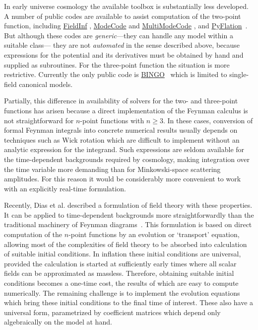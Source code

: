 \documentclass[11pt,a4paper]{article}
\newcommand{\packagefont}{\sffamily}
\newcommand{\ModeCode}{{\packagefont ModeCode}}
\newcommand{\MultiModeCode}{{\packagefont MultiModeCode}}
\newcommand{\FieldInf}{{\packagefont FieldInf}}
\newcommand{\PyFlation}{{\packagefont PyFlation}}
\newcommand{\BINGO}{{\packagefont BINGO}}
\renewcommand{\geq}{\geqslant}
\begin{document}
In early universe cosmology the available toolbox is substantially less developed.
A number of public codes are available to assist computation of the
two-point function,
including
\href{http://theory.physics.unige.ch/~ringeval/fieldinf.html}{\FieldInf}
\cite{Ringeval:2005yn,Martin:2006rs,Ringeval:2007am},
\href{http://modecode.org}{\ModeCode} and
\href{http://modecode.org}{\MultiModeCode}
\cite{Mortonson:2010er,Easther:2011yq,Norena:2012rs,Price:2014xpa},
and
\href{http://pyflation.ianhuston.net}{\PyFlation}~\cite{Huston:2009ac,
Huston:2011vt,Huston:2011fr}.
But although these codes are \emph{generic}---they can handle any model
within a suitable class---%
they are not \emph{automated} in the sense described above,
because expressions for the potential and its derivatives must be obtained
by hand and supplied as subroutines.
For the three-point function the situation is more restrictive.
Currently the only public code is
\href{https://sites.google.com/site/codecosmo/bingo}{\BINGO}~\cite{Hazra:2012yn,
Sreenath:2014nca}
which is limited to single-field canonical models.

Partially, this difference
in availability of solvers for the two- and three-point functions
has arisen because
a direct implementation of the Feynman calculus is not straightforward
for $n$-point functions with $n \geq 3$.
In these cases, conversion of formal Feynman integrals into concrete
numerical results
usually
depends on techniques such as Wick rotation
which are difficult to implement without an analytic
expression for the integrand.
Such expressions are seldom available
for the time-dependent backgrounds required by cosmology,
making
integration over the time variable more
demanding than for Minkowski-space scattering amplitudes.
For this reason it would be considerably more convenient to work with an
explicitly real-time formulation.

Recently, Dias et al. described a
formulation of field theory with these properties.
It can be applied to time-dependent backgrounds more straightforwardly
than the traditional machinery of Feynman diagrams~\cite{DiasFrazerMulryneSeery}.
This formulation is based on direct computation of the $n$-point functions
by an evolution or `transport' equation,
allowing most of the complexities of field theory to be absorbed into
calculation of suitable initial conditions.
In inflation these initial conditions are universal,
provided the calculation is started at sufficiently early times where
all scalar fields can be approximated as massless.
Therefore, obtaining suitable initial conditions becomes a one-time
cost, the results of which are easy to compute numerically.
The remaining challenge is to implement the evolution equations which
bring these initial conditions
to the final time of interest.
These also have a universal form,
parametrized by coefficient matrices
which depend only algebraically on the model at hand.
\end{document}
